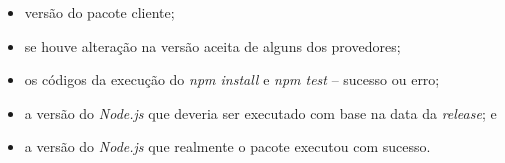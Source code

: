 \begin{itemize}
    \item versão do pacote cliente;
    \item se houve alteração na versão aceita de alguns dos provedores;
    \item os códigos da execução do \textit{npm install} e \textit{npm test} -- sucesso ou erro;
    \item a versão do \textit{Node.js} que deveria ser executado com base na data da \textit{release}; e
    \item a versão do \textit{Node.js} que realmente o pacote executou com sucesso.
\end{itemize}{}